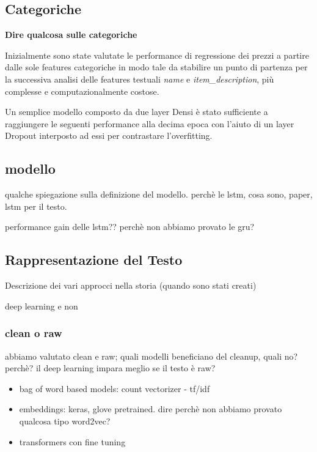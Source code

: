 \subsection{Categoriche}
\textbf{Dire qualcosa sulle categoriche}

Inizialmente sono state valutate le performance di regressione dei prezzi a
partire dalle sole features categoriche in modo tale da stabilire un punto di
partenza per la successiva analisi delle features testuali \textit{name} e
\textit{item\_description}, più complesse e computazionalmente costose.

Un semplice modello composto da due layer Densi è stato sufficiente a
raggiungere le seguenti performance alla decima epoca con l'aiuto di un layer
Dropout interposto ad essi per contrastare l'overfitting.



\subsection{modello}
qualche spiegazione sulla definizione del modello.
perchè le lstm, cosa sono, paper, lstm per il testo.

performance gain delle lstm??
perchè non abbiamo provato le gru?

\subsection{Rappresentazione del Testo}
Descrizione dei vari approcci nella storia (quando sono stati creati)

deep learning e non

\subsubsection{clean o raw}
abbiamo valutato clean e raw; quali modelli beneficiano del cleanup, quali no?
perchè? il deep learning impara meglio se il testo è raw?

\begin{itemize}
    \item bag of word based models: count vectorizer - tf/idf
    \item embeddings: keras, glove pretrained. dire perchè non abbiamo provato
    qualcosa tipo word2vec?
    \item transformers con fine tuning
\end{itemize}

